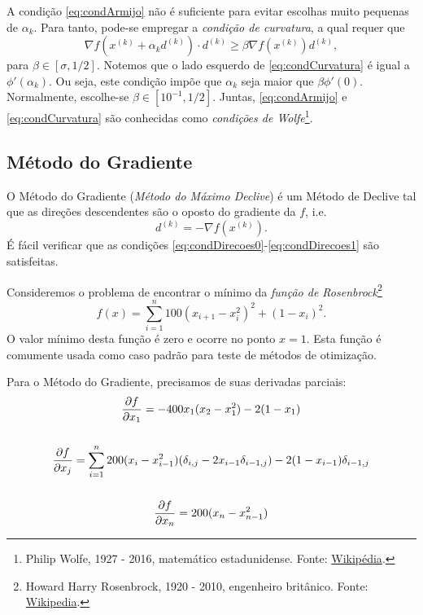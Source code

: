 A condição \eqref{eq:condArmijo} não é suficiente para evitar escolhas muito pequenas de $\alpha_k$. Para tanto, pode-se empregar a \emph{condição de curvatura}, a qual requer que
\begin{equation}\label{eq:condCurvatura}
  \nabla f(x^{(k)} + \alpha_kd^{(k)})\cdot d^{(k)} \geq \beta\nabla f(x^{(k)})d^{(k)},
\end{equation}
para $\beta\in [\sigma, 1/2]$. Notemos que o lado esquerdo de \eqref{eq:condCurvatura} é igual a $\phi'(\alpha_k)$. Ou seja, este condição impõe que $\alpha_k$ seja maior que $\beta\phi'(0)$. Normalmente, escolhe-se $\beta\in [10^{-1}, 1/2]$. Juntas, \eqref{eq:condArmijo} e \eqref{eq:condCurvatura} são conhecidas como \emph{condições de Wolfe}\footnote{Philip Wolfe, 1927 - 2016, matemático estadunidense. Fonte: \href{https://pt.wikipedia.org/wiki/Philip_Wolfe}{Wikipédia}.}.

\subsection{Método do Gradiente}

O Método do Gradiente (\emph{Método do Máximo Declive}) é um Método de Declive tal que as direções descendentes são o oposto do gradiente da $f$, i.e.
\begin{equation}
  d^{(k)} = -\nabla f(x^{(k)}).
\end{equation}
É fácil verificar que as condições \eqref{eq:condDirecoes0}-\eqref{eq:condDirecoes1} são satisfeitas.

\begin{ex}\label{ex:Rosenbrock}
  Consideremos o problema de encontrar o mínimo da \emph{função de Rosenbrock}\footnote{Howard Harry Rosenbrock, 1920 - 2010, engenheiro britânico. Fonte: \href{https://en.wikipedia.org/wiki/Howard_Harry_Rosenbrock}{Wikipedia}.}
  \begin{equation}
    f(x) = \sum_{i=1}^n 100(x_{i+1}-x_i^2)^2 + (1-x_i)^2.
  \end{equation}
  O valor mínimo desta função é zero e ocorre no ponto $x=1$. Esta função é comumente usada como caso padrão para teste de métodos de otimização.

  Para o Método do Gradiente, precisamos de suas derivadas parciais:
  \begin{gather}
    \frac{\partial f}{\partial x_1} = -400x_1(x_2-x_1^2) - 2(1-x_1)\\
    ~\nonumber\\
    \frac{\partial f}{\partial x_j} = \sum_{i=1}^n 200(x_i-x_{i-1}^2)(\delta_{i,j}-2x_{i-1}\delta_{i-1,j})-2(1-x_{i-1})\delta_{i-1,j}\\
    ~\nonumber\\
    \frac{\partial f}{\partial x_{n}} = 200(x_n - x_{n-1}^2)
  \end{gather}

  
\end{ex}

